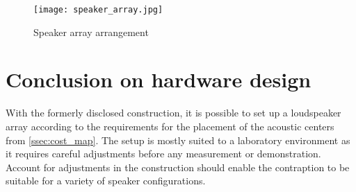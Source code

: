 \begin{figure}[H]
	\centering
    \texttt{[image: speaker\_array.jpg]}
    \caption{Speaker array arrangement}
    \label{fig:array_pic}
\end{figure}
\section{Conclusion on hardware design}
With the formerly disclosed construction, it is possible to set up a loudspeaker array according to the requirements for the placement of the acoustic centers from \autoref{ssec:cost_map}. The setup is mostly suited to a laboratory environment as it requires careful adjustments before any measurement or demonstration. Account for adjustments in the construction should enable the contraption to be suitable for a variety of speaker configurations.




